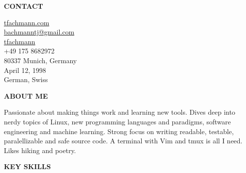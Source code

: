 \documentclass[a4paper, 10pt]{article}
\begin{document}
\begin{tcbraster}[raster columns=7]
\begin{tcolorbox}[left=4pt, right=4pt, top=4pt, height=1.0\textheight, colback=sidebar, boxrule=0.5pt, arc=8pt, frame empty, raster multicolumn=2, nobeforeafter]
    \vspace{6mm}
    \begin{center}
        {\textbf{CONTACT}} \\
    \end{center}
    \small
    \begin{spacing}{1.325}
        \hspace*{10pt} \href{https://tfachmann.com}{tfachmann.com} \\
        \hspace*{10pt} \href{mailto:bachmanntj@gmail.com}{bachmanntj@gmail.com} \\
        \hspace*{10pt} \href{https://github.com/tfachmann}{tfachmann} \\
        \hspace*{10pt} +49 175 8682972 \\
        \hspace*{10pt} 80337 Munich, Germany \\
        \hspace*{10pt} April 12, 1998 \\
        \hspace*{10pt} German, Swiss
    \end{spacing}
    \vspace{6mm}

    \begin{center}
        {\textbf{ABOUT ME}} \\
    \end{center}
    \begin{center}
        Passionate about making things work and learning new tools.
        Dives deep into nerdy topics of Linux, new programming languages and paradigms, software engineering and machine learning.
        Strong focus on writing readable, testable, paralellizable and safe source code.
        A terminal with Vim and tmux is all I need.
        Likes hiking and poetry.
    \end{center}

    \vspace{4mm}
    \begin{center}
        {\textbf{KEY SKILLS}} \\
    \end{center}


\end{tcolorbox}
\end{tcbraster}
\end{document}
